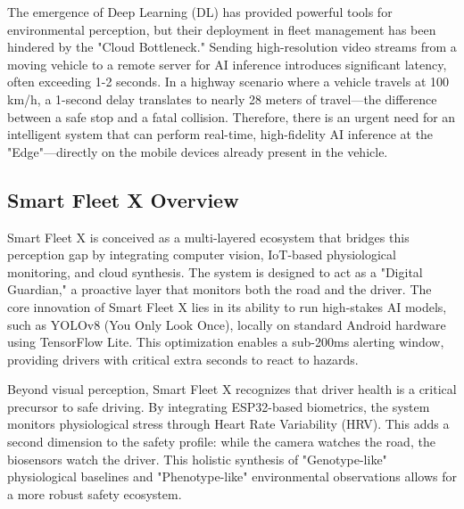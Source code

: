 \documentclass[conference]{IEEEtran}
\begin{document}
The emergence of Deep Learning (DL) has provided powerful tools for environmental perception, but their deployment in fleet management has been hindered by the "Cloud Bottleneck." Sending high-resolution video streams from a moving vehicle to a remote server for AI inference introduces significant latency, often exceeding 1-2 seconds. In a highway scenario where a vehicle travels at 100 km/h, a 1-second delay translates to nearly 28 meters of travel—the difference between a safe stop and a fatal collision. Therefore, there is an urgent need for an intelligent system that can perform real-time, high-fidelity AI inference at the "Edge"—directly on the mobile devices already present in the vehicle.

\subsection{Smart Fleet X Overview}
Smart Fleet X is conceived as a multi-layered ecosystem that bridges this perception gap by integrating computer vision, IoT-based physiological monitoring, and cloud synthesis. The system is designed to act as a "Digital Guardian," a proactive layer that monitors both the road and the driver. The core innovation of Smart Fleet X lies in its ability to run high-stakes AI models, such as YOLOv8 (You Only Look Once), locally on standard Android hardware using TensorFlow Lite. This optimization enables a sub-200ms alerting window, providing drivers with critical extra seconds to react to hazards.

Beyond visual perception, Smart Fleet X recognizes that driver health is a critical precursor to safe driving. By integrating ESP32-based biometrics, the system monitors physiological stress through Heart Rate Variability (HRV). This adds a second dimension to the safety profile: while the camera watches the road, the biosensors watch the driver. This holistic synthesis of "Genotype-like" physiological baselines and "Phenotype-like" environmental observations allows for a more robust safety ecosystem.
\end{document}
